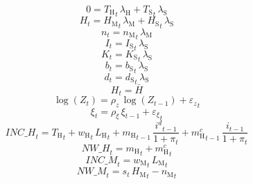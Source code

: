 \begin{dmath}
0={T_\mathrm{H}}_{t}\, {\lambda_\mathrm{H}}+{T_\mathrm{S}}_{t}\, {\lambda_\mathrm{S}}
\end{dmath}
\begin{dmath}
{H}_{t}={H_\mathrm{M}}_{t}\, {\lambda_\mathrm{M}}+{H_\mathrm{S}}_{t}\, {\lambda_\mathrm{S}}
\end{dmath}
\begin{dmath}
{n}_{t}={n_\mathrm{M}}_{t}\, {\lambda_\mathrm{M}}
\end{dmath}
\begin{dmath}
{I}_{t}={I_\mathrm{S}}_{t}\, {\lambda_\mathrm{S}}
\end{dmath}
\begin{dmath}
{K}_{t}={K_\mathrm{S}}_{t}\, {\lambda_\mathrm{S}}
\end{dmath}
\begin{dmath}
{b}_{t}={b_\mathrm{S}}_{t}\, {\lambda_\mathrm{S}}
\end{dmath}
\begin{dmath}
{d}_{t}={d_\mathrm{S}}_{t}\, {\lambda_\mathrm{S}}
\end{dmath}
\begin{dmath}
{H}_{t}={\bar{H}}
\end{dmath}
\begin{dmath}
\log\left({Z}_{t}\right)={\rho_z}\, \log\left({Z}_{t-1}\right)+{\varepsilon_z}_{t}
\end{dmath}
\begin{dmath}
{\xi}_{t}={\rho_\xi}\, {\xi}_{t-1}+{\varepsilon_\xi}_{t}
\end{dmath}
\begin{dmath}
{INC\_H}_{t}={T_\mathrm{H}}_{t}+{w_\mathrm{H}}_{t}\, {L_\mathrm{H}}_{t}+{m_\mathrm{H}}_{t-1}\, \frac{{i^d}_{t-1}}{1+{\pi}_{t}}+{m^c_\mathrm{H}}_{t-1}\, \frac{{i}_{t-1}}{1+{\pi}_{t}}
\end{dmath}
\begin{dmath}
{NW\_H}_{t}={m_\mathrm{H}}_{t}+{m^c_\mathrm{H}}_{t}
\end{dmath}
\begin{dmath}
{INC\_M}_{t}={w_\mathrm{M}}_{t}\, {L_\mathrm{M}}_{t}
\end{dmath}
\begin{dmath}
{NW\_M}_{t}={s}_{t}\, {H_\mathrm{M}}_{t}-{n_\mathrm{M}}_{t}
\end{dmath}
